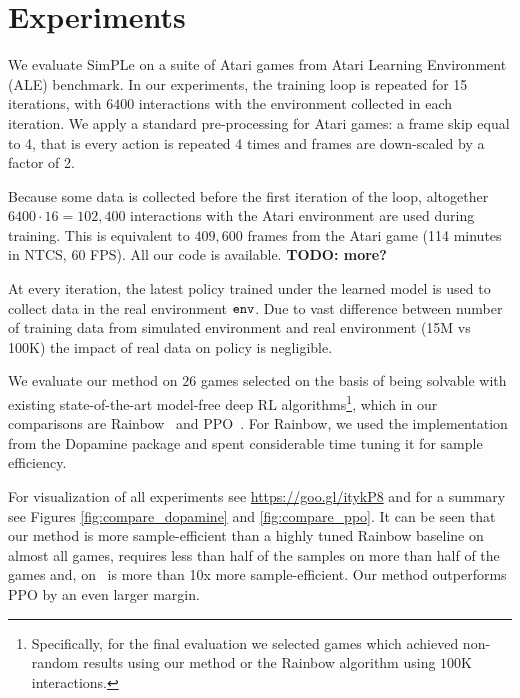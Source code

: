 \section{Experiments}
\label{sec:experiments}

We evaluate SimPLe on a suite of Atari games from Atari Learning Environment (ALE) benchmark.
In our experiments, the training loop is repeated for 15 iterations, with $6400$ interactions with the environment collected in each iteration.
We apply a standard pre-processing for Atari games: a frame skip equal to 4, that is every action
is repeated 4 times and frames are down-scaled by a factor of 2.

Because some data is collected before the first iteration of the loop,
altogether $6400 \cdot 16 = 102,400$ interactions with the Atari environment are used during training.
This is equivalent to $409,600$ frames from the Atari game (114 minutes in NTCS, 60 FPS).
All our code is available. \textbf{TODO: more?}

At every iteration, the latest policy trained under the learned model is used to collect data in the real environment ${\texttt{env}}$.
Due to vast difference between number of training data from simulated environment and real environment (15M vs 100K) the impact of real data on policy is negligible.

 We evaluate our method on $26$ games selected on the basis of being solvable with existing state-of-the-art model-free deep RL algorithms\footnote{Specifically, for the final evaluation we selected games which achieved non-random results using our method or the Rainbow algorithm using $100$K interactions.}, which in our comparisons are Rainbow~\citep{rainbow} and PPO~\citep{ppo}.
 For Rainbow, we used the implementation from the Dopamine package and spent considerable time tuning it for sample efficiency.

For visualization of all experiments see \url{https://goo.gl/itykP8}
and for a summary see Figures \ref{fig:compare_dopamine} and  \ref{fig:compare_ppo}.
It can be seen that our method is more sample-efficient than a highly tuned Rainbow baseline on almost all games, requires less than half of the samples on more than half of the games and, on \freeway\, is more than 10x more sample-efficient. Our method outperforms PPO by an even larger margin.

